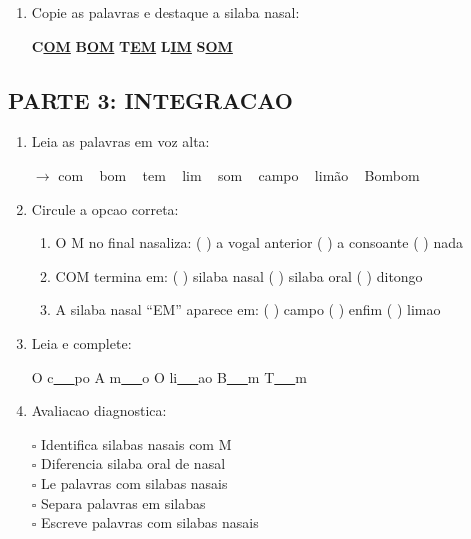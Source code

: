 \begin{exercicio}
\begin{enumerate}[resume]
  \item Copie as palavras e destaque a silaba nasal:
  \begin{center}
  \textbf{C}\underline{\textbf{OM}} \quad \textbf{B}\underline{\textbf{OM}} \quad \textbf{T}\underline{\textbf{EM}} \quad \textbf{L}\underline{\textbf{IM}} \quad \textbf{S}\underline{\textbf{OM}}
  \end{center}
\end{enumerate}

\subsection*{PARTE 3: INTEGRACAO}

\begin{enumerate}[resume]
  \item Leia as palavras em voz alta:
  \begin{center}
  $\rightarrow$ com  ~  bom  ~  tem  ~  lim  ~  som  ~  campo  ~  lim\~{a}o  ~  Bombom
  \end{center}

  \item Circule a opcao correta:
  \begin{enumerate}[label=(\alph*)]
    \item O M no final nasaliza: ( ) a vogal anterior ( ) a consoante ( ) nada
    \item COM termina em: ( ) silaba nasal ( ) silaba oral ( ) ditongo
    \item A silaba nasal ``EM'' aparece em: ( ) campo ( ) enfim ( ) limao
  \end{enumerate}

  \item Leia e complete:
  \begin{center}
  O c\underline{~~~}po \quad A m\underline{~~~}o \quad O li\underline{~~~}ao \quad B\underline{~~~}m \quad T\underline{~~~}m
  \end{center}

  \item Avaliacao diagnostica:
  \begin{center}
  $\square$ Identifica silabas nasais com M\\
  $\square$ Diferencia silaba oral de nasal\\
  $\square$ Le palavras com silabas nasais\\
  $\square$ Separa palavras em silabas\\
  $\square$ Escreve palavras com silabas nasais
  \end{center}
\end{enumerate}
\end{exercicio}

